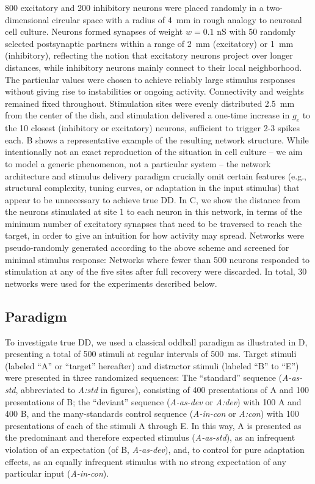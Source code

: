 \documentclass[9pt,lineno,onehalfspacing]{elife}
\newcommand{\dev}{\textit{A-as-dev}}
\newcommand{\msc}{\textit{A-in-con}}
\newcommand{\std}{\textit{A-as-std}}
\begin{document}
800 excitatory and 200 inhibitory neurons were placed randomly in a two-dimensional circular space with a radius of 4~mm in rough analogy to neuronal cell culture. Neurons formed synapses of weight $w = 0.1$ nS with 50 randomly selected postsynaptic partners within a range of 2~mm (excitatory) or 1~mm (inhibitory), reflecting the notion that excitatory neurons project over longer distances, while inhibitory neurons mainly connect to their local neighborhood. The particular values were chosen to achieve reliably large stimulus responses without giving rise to instabilities or ongoing activity. Connectivity and weights remained fixed throughout. Stimulation sites were evenly distributed 2.5~mm from the center of the dish, and stimulation delivered a one-time increase in $g_e$ to the 10 closest (inhibitory or excitatory) neurons, sufficient to trigger 2-3 spikes each. B shows a representative example of the resulting network structure. While intentionally not an exact reproduction of the situation in cell culture -- we aim to model a generic phenomenon, not a particular system -- the network architecture and stimulus delivery paradigm crucially omit certain features (e.g., structural complexity, tuning curves, or adaptation in the input stimulus) that appear to be unnecessary to achieve true DD. In C, we show the distance from the neurons stimulated at site 1 to each neuron in this network, in terms of the minimum number of excitatory synapses that need to be traversed to reach the target, in order to give an intuition for how activity may spread. Networks were pseudo-randomly generated according to the above scheme and screened for minimal stimulus response: Networks where fewer than 500 neurons responded to stimulation at any of the five sites after full recovery were discarded. In total, 30 networks were used for the experiments described below.

\subsection{Paradigm}\label{sec:paradigm}

To investigate true DD, we used a classical oddball paradigm as illustrated in D, presenting a total of 500 stimuli at regular intervals of 500~ms. Target stimuli (labeled ``A'' or ``target'' hereafter) and distractor stimuli (labeled ``B'' to ``E'') were presented in three randomized sequences: The ``standard'' sequence (\std{}, abbreviated to \textit{A:std} in figures), consisting of 400 presentations of A and 100 presentations of B; the ``deviant'' sequence (\dev{} or \textit{A:dev}) with 100 A and 400 B, and the many-standards control sequence (\msc{} or \textit{A:con}) with 100 presentations of each of the stimuli A through E. In this way, A is presented as the predominant and therefore expected stimulus (\std{}), as an infrequent violation of an expectation (of B, \dev{}), and, to control for pure adaptation effects, as an equally infrequent stimulus with no strong expectation of any particular input (\msc{}).
\end{document}
